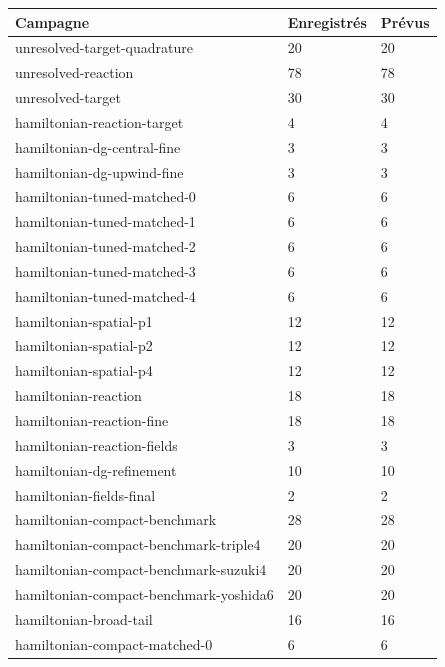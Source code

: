 \documentclass[10pt,a4paper]{article}
\begin{document}
\begin{center}\small\begin{tabular}{lll}\toprule
Campagne & Enregistrés & Prévus\\\midrule
unresolved-target-quadrature & 20 & 20\\
unresolved-reaction & 78 & 78\\
unresolved-target & 30 & 30\\
hamiltonian-reaction-target & 4 & 4\\
hamiltonian-dg-central-fine & 3 & 3\\
hamiltonian-dg-upwind-fine & 3 & 3\\
hamiltonian-tuned-matched-0 & 6 & 6\\
hamiltonian-tuned-matched-1 & 6 & 6\\
hamiltonian-tuned-matched-2 & 6 & 6\\
hamiltonian-tuned-matched-3 & 6 & 6\\
hamiltonian-tuned-matched-4 & 6 & 6\\
hamiltonian-spatial-p1 & 12 & 12\\
hamiltonian-spatial-p2 & 12 & 12\\
hamiltonian-spatial-p4 & 12 & 12\\
hamiltonian-reaction & 18 & 18\\
hamiltonian-reaction-fine & 18 & 18\\
hamiltonian-reaction-fields & 3 & 3\\
hamiltonian-dg-refinement & 10 & 10\\
hamiltonian-fields-final & 2 & 2\\
hamiltonian-compact-benchmark & 28 & 28\\
hamiltonian-compact-benchmark-triple4 & 20 & 20\\
hamiltonian-compact-benchmark-suzuki4 & 20 & 20\\
hamiltonian-compact-benchmark-yoshida6 & 20 & 20\\
hamiltonian-broad-tail & 16 & 16\\
hamiltonian-compact-matched-0 & 6 & 6\\
\bottomrule\end{tabular}\end{center}
\end{document}

